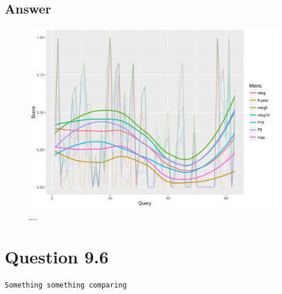 \documentclass[11pt]{article}
\newenvironment{code}{\captionsetup{type=listing}}{}
\begin{document}
\subsection{Answer} 
\begin{figure}[H]
\centering
\includegraphics[scale=0.9]{q3_plot.png}
\caption{....}
\label{fig:q3plot}
\end{figure}
\begin{code}
\label{code:q3}
\end{code}
\begin{code}
\label{code:q3p}
\end{code}
\newpage
\section{Question 9.6} \label{q4}
\begin{verbatim}
Something something comparing
\end{verbatim}
\end{document}
